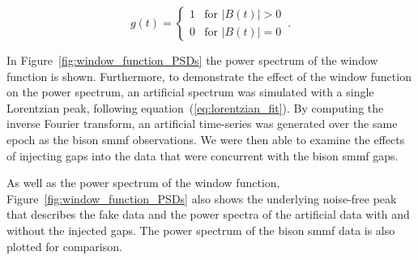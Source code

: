 \begin{equation}
g(t) = 
\begin{cases} 
1 & \text{for } |B(t)| > 0 \\
0       & \text{for } |B(t)| = 0
\end{cases} \, .
\label{eq:window}
\end{equation}

In Figure~\ref{fig:window_function_PSDs} the power spectrum of the window function is shown. Furthermore, to demonstrate the effect of the window function on the power spectrum, an artificial spectrum was simulated with a single Lorentzian peak, following equation~(\ref{eq:lorentzian_fit}). By computing the inverse Fourier transform, an artificial time-series was generated over the same epoch as the \gls{bison} \gls{smmf} observations. We were then able to examine the effects of injecting gaps into the data that were concurrent with the \gls{bison} \gls{smmf} gaps. 

As well as the power spectrum of the window function, Figure~\ref{fig:window_function_PSDs} also shows the underlying noise-free peak that describes the fake data and the power spectra of the artificial data with and without the injected gaps. The power spectrum of the \gls{bison} \gls{smmf} data is also plotted for comparison.



